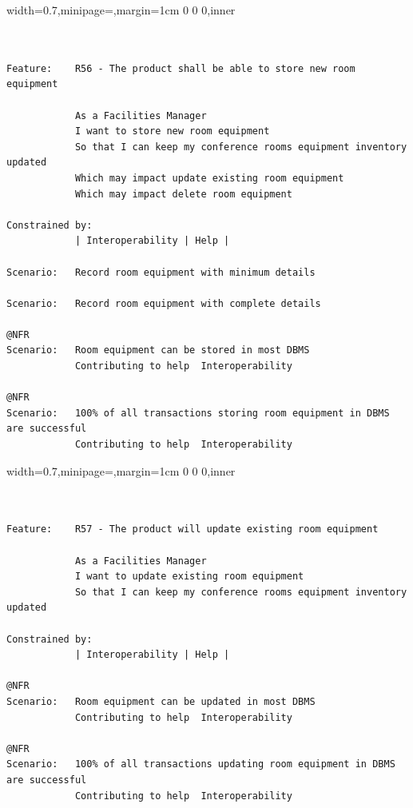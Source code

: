 \documentclass[dissertation,final]{softeng}
\newenvironment{featurecode}[1]
{ \lrbox\featurebox \begin{adjustbox}{width=#1\textwidth,minipage=\textwidth,margin=1cm 0 0 0,inner} }
{ \end{adjustbox}\endlrbox}
\newenvironment{featurelist}[2]
{
\newcommand{\setcaption}{\caption{#1}}
\newcommand{\setlabel}{\label{#2}}
}
{\begin{listing}[h!]\centering\usebox\featurebox\setcaption\setlabel\end{listing}}
\begin{document}
\begin{appendices}
\begin{featurelist}{R56 -- The product shall be able to store new room equipment}{lst:feature_r56}
\begin{featurecode}{0.7}
\begin{verbatim}


Feature:    R56 - The product shall be able to store new room equipment

            As a Facilities Manager
            I want to store new room equipment
            So that I can keep my conference rooms equipment inventory updated
            Which may impact update existing room equipment
            Which may impact delete room equipment
			
Constrained by:
            | Interoperability | Help |

Scenario:   Record room equipment with minimum details

Scenario:   Record room equipment with complete details

@NFR
Scenario:   Room equipment can be stored in most DBMS
            Contributing to help  Interoperability

@NFR
Scenario:   100% of all transactions storing room equipment in DBMS are successful
            Contributing to help  Interoperability
\end{verbatim}
\end{featurecode}
\end{featurelist}
\clearpage

\begin{featurelist}{R57 -- The product will update existing room equipment}{lst:feature_r57}
\begin{featurecode}{0.7}
\begin{verbatim}


Feature:    R57 - The product will update existing room equipment

            As a Facilities Manager
            I want to update existing room equipment
            So that I can keep my conference rooms equipment inventory updated
			
Constrained by:
            | Interoperability | Help |

@NFR
Scenario:   Room equipment can be updated in most DBMS
            Contributing to help  Interoperability

@NFR
Scenario:   100% of all transactions updating room equipment in DBMS are successful
            Contributing to help  Interoperability
\end{verbatim}
\end{featurecode}
\end{featurelist}


\end{appendices}
\end{document}
